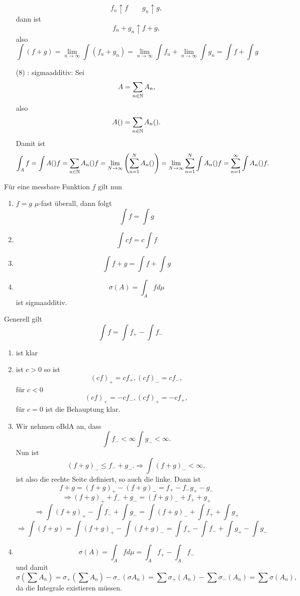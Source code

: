 \begin{bew}
\begin{enumerate}[1]
					\[ f_n\uparrow f\qquad g_n\uparrow g, \]
					dann ist
					\[ f_n+g_n\uparrow f+g, \]
					also
					\[ \int (f+g)=\lim_{n\to\infty}\int (f_n+g_n)=\lim_{n\to\infty}\int f_n+\lim_{n\to\infty} \int g_n=\int f+\int g  \]
					\arge 
					\item[(8)] \zz: sigmaadditiv:\newline
					Sei
					\[ A=\sum_{n\in\mathbb{N}} A_n, \]
					also
					\[ A()=\sum_{n\in\mathbb{N}}A_n(). \]
					Damit ist
					\[ \int_A f=\int A() f=\sum_{n\in\mathbb{N}}A_n()f=\lim_{N\to\infty}\left(\sum_{n=1}^{N} A_n()\right)=\lim_{N\to\infty}\sum_{n=1}^N\int A_n() f=\sum_{n=1}^\infty \int A_n() f. \]
					\arge
				\end{enumerate}
				
			\end{bew}
			
			
			\begin{satz}
				Für eine messbare Funktion $f$ gilt nun
				\begin{enumerate}[(1)]
					\item $f=g$ $\mu$-fast überall, dann folgt
					\[ \int f=\int g \]
					\item 
					\[ \int cf=c\int f \]
					\item 
					\[ \int f+g=\int f+\int g \]
					\item 
					\[ \sigma(A)=\int_A fd\mu \]
					ist sigmaadditiv. 
				\end{enumerate}
			\end{satz}
				
			\begin{bew}
				Generell gilt
				\[ \int f=\int f_+-\int f_- \]
				\begin{enumerate}[(1)]
					\item ist klar
					\item ist $c>0$ so ist 
					\[ (cf)_+=c f_+, (cf)_-=cf_-, \]
					für $c<0$
					\[ (cf)_+=-cf_-, (cf)_+=-cf_+, \]
					für $c=0$ ist die Behauptung klar.\arge
					\item Wir nehmen oBdA an, dass
					\[ \int f_-<\infty \int g_-<\infty. \]
					Nun ist
					\[ (f+g)_-\le f_-+g_-.\Rightarrow \int (f+g)_-<\infty, \]
					ist also die rechte Seite definiert, so auch die linke.
					Dann ist 
					\[ f+g=(f+g)_+-(f+g)_-=f_+-f_-g_+-g_- \]
					\[ \Rightarrow(f+g)_++f_-+g_-=(f+g)_-+f_++g_+ \]
					\[ \Rightarrow\int (f+g)_+-\int f_-+\int g_-=\int(f+g)_-+\int f_++\int g_+ \]
					\[ \Rightarrow \int (f+g)=\int (f+g)_+-\int (f+g)_-=\int f_+-\int f_-+\int g_+-\int g_- \]
					\arge
					\item
					\[ \sigma(A)=\int_A fd\mu=\int_{A}f_+-\int_A f_- \]
					und damit
					\[ \sigma(\sum A_n)=\sigma_+(\sum A_n)-\sigma_-(\sigma A_n)=\sum\sigma_+(A_n)-\sum\sigma_-(A_n)=\sum\sigma(A_n), \]
					da die Integrale existieren müssen. \arge  
				\end{enumerate}
			\end{bew}
				
